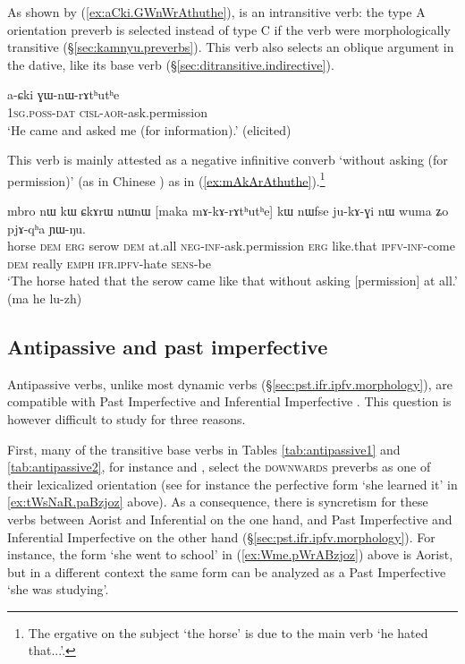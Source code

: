 As shown by (\ref{ex:aCki.GWnWrAthuthe}),  is an intransitive verb: the type A orientation preverb  is selected instead of type C if the verb were morphologically transitive (§\ref{sec:kamnyu.preverbs}). This verb also selects an oblique argument in the dative, like its base verb (§\ref{sec:ditransitive.indirective}).


\begin{exe}
\ex \label{ex:aCki.GWnWrAthuthe}
\gll  a-ɕki ɣɯ-nɯ-rɤtʰutʰe \\
\textsc{1sg}.\textsc{poss}-\textsc{dat} \textsc{cisl}-\textsc{aor}-ask.permission \\
\glt `He came and asked me (for information).' (elicited)
\end{exe}

This verb is mainly attested as a negative infinitive converb  `without asking (for permission)' (as in Chinese ) as in (\ref{ex:mAkArAthuthe}).\footnote{The ergative on the subject  `the horse' is due to the main verb  `he hated that...'. }


\begin{exe}
	\ex \label{ex:mAkArAthuthe}
	\gll mbro nɯ kɯ ɕkɤrɯ nɯnɯ [maka mɤ-kɤ-rɤtʰutʰe] kɯ nɯfse ju-kɤ-ɣi nɯ wuma ʑo pjɤ-qʰa ɲɯ-ŋu.  \\
	horse \textsc{dem} \textsc{erg} serow \textsc{dem} at.all \textsc{neg}-\textsc{inf}-ask.permission \textsc{erg} like.that \textsc{ipfv}-\textsc{inf}-come \textsc{dem} really \textsc{emph} \textsc{ifr}.\textsc{ipfv}-hate \textsc{sens}-be \\
	\glt `The horse hated that the serow came like that without asking [permission] at all.' (ma he lu-zh)
\end{exe} 

  \subsection{Antipassive and past imperfective} \label{sec:antipassive.pst.ipfv}
    
Antipassive verbs, unlike most dynamic verbs (§\ref{sec:pst.ifr.ipfv.morphology}), are compatible with Past Imperfective  and Inferential Imperfective . This question is however difficult to study for three reasons. 

First, many of the transitive base verbs in Tables \ref{tab:antipassive1} and \ref{tab:antipassive2}, for instance  and , select the \textsc{downwards} preverbs as one of their lexicalized orientation (see for instance the perfective form  `she learned it' in \ref{ex:tWsNaR.paBzjoz} above). As a consequence, there is syncretism for these verbs between Aorist and Inferential on the one hand, and Past Imperfective and Inferential Imperfective on the other hand (§\ref{sec:pst.ifr.ipfv.morphology}). For instance, the form  `she went to school' in (\ref{ex:Wme.pWrABzjoz}) above is Aorist, but in a different context the same form can be analyzed as a Past Imperfective `she was studying'.

